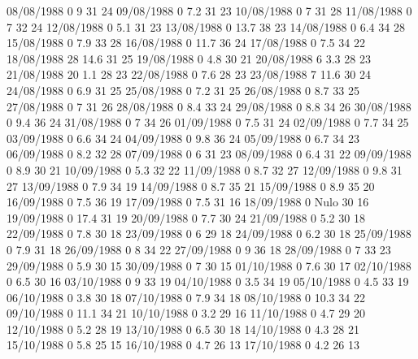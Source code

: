 08/08/1988  0      9      31     24 
09/08/1988  0      7.2    31     23 
10/08/1988  0      7      31     28 
11/08/1988  0      7      32     24 
12/08/1988  0      5.1    31     23 
13/08/1988  0      13.7   38     23 
14/08/1988  0      6.4    34     28 
15/08/1988  0      7.9    33     28 
16/08/1988  0      11.7   36     24 
17/08/1988  0      7.5    34     22 
18/08/1988  28     14.6   31     25 
19/08/1988  0      4.8    30     21 
20/08/1988  6      3.3    28     23 
21/08/1988  20     1.1    28     23 
22/08/1988  0      7.6    28     23 
23/08/1988  7      11.6   30     24 
24/08/1988  0      6.9    31     25 
25/08/1988  0      7.2    31     25 
26/08/1988  0      8.7    33     25 
27/08/1988  0      7      31     26 
28/08/1988  0      8.4    33     24 
29/08/1988  0      8.8    34     26 
30/08/1988  0      9.4    36     24 
31/08/1988  0      7      34     26 
01/09/1988  0      7.5    31     24 
02/09/1988  0      7.7    34     25 
03/09/1988  0      6.6    34     24 
04/09/1988  0      9.8    36     24 
05/09/1988  0      6.7    34     23 
06/09/1988  0      8.2    32     28 
07/09/1988  0      6      31     23 
08/09/1988  0      6.4    31     22 
09/09/1988  0      8.9    30     21 
10/09/1988  0      5.3    32     22 
11/09/1988  0      8.7    32     27 
12/09/1988  0      9.8    31     27 
13/09/1988  0      7.9    34     19 
14/09/1988  0      8.7    35     21 
15/09/1988  0      8.9    35     20 
16/09/1988  0      7.5    36     19 
17/09/1988  0      7.5    31     16 
18/09/1988  0     Nulo    30     16 
19/09/1988  0      17.4   31     19 
20/09/1988  0      7.7    30     24 
21/09/1988  0      5.2    30     18 
22/09/1988  0      7.8    30     18 
23/09/1988  0      6      29     18 
24/09/1988  0      6.2    30     18 
25/09/1988  0      7.9    31     18 
26/09/1988  0      8      34     22 
27/09/1988  0      9      36     18 
28/09/1988  0      7      33     23 
29/09/1988  0      5.9    30     15 
30/09/1988  0      7      30     15 
01/10/1988  0      7.6    30     17 
02/10/1988  0      6.5    30     16 
03/10/1988  0      9      33     19 
04/10/1988  0      3.5    34     19 
05/10/1988  0      4.5    33     19 
06/10/1988  0      3.8    30     18 
07/10/1988  0      7.9    34     18 
08/10/1988  0      10.3   34     22 
09/10/1988  0      11.1   34     21 
10/10/1988  0      3.2    29     16 
11/10/1988  0      4.7    29     20 
12/10/1988  0      5.2    28     19 
13/10/1988  0      6.5    30     18 
14/10/1988  0      4.3    28     21 
15/10/1988  0      5.8    25     15 
16/10/1988  0      4.7    26     13 
17/10/1988  0      4.2    26     13 
